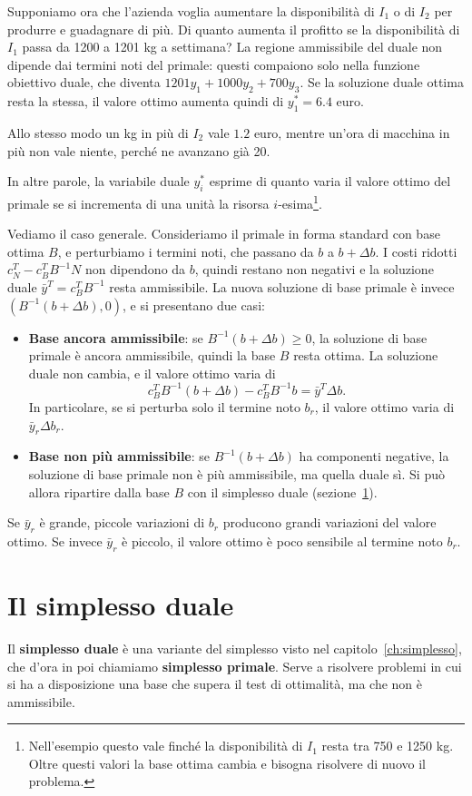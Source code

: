 Supponiamo ora che l'azienda voglia aumentare la disponibilità di $I_1$ o di $I_2$ per produrre e guadagnare di più. Di quanto aumenta il profitto se la disponibilità di $I_1$ passa da 1200 a 1201 kg a settimana? La regione ammissibile del duale non dipende dai termini noti del primale: questi compaiono solo nella funzione obiettivo duale, che diventa $1201y_1 + 1000y_2 + 700y_3$. Se la soluzione duale ottima resta la stessa, il valore ottimo aumenta quindi di $y_1^* = 6.4$ euro.

Allo stesso modo un kg in più di $I_2$ vale $1.2$ euro, mentre un'ora di macchina in più non vale niente, perché ne avanzano già 20.

In altre parole, la variabile duale $y_i^*$ esprime di quanto varia il valore ottimo del primale se si incrementa di una unità la risorsa $i$-esima\footnote{Nell'esempio questo vale finché la disponibilità di $I_1$ resta tra 750 e 1250 kg. Oltre questi valori la base ottima cambia e bisogna risolvere di nuovo il problema.}.

Vediamo il caso generale. Consideriamo il primale in forma standard con base ottima $B$, e perturbiamo i termini noti, che passano da $b$ a $b + \Delta b$. I costi ridotti $c_N^T - c_B^T B^{-1} N$ non dipendono da $b$, quindi restano non negativi e la soluzione duale $\bar{y}^T = c_B^T B^{-1}$ resta ammissibile. La nuova soluzione di base primale è invece $(B^{-1}(b + \Delta b), 0)$, e si presentano due casi:
\begin{itemize}
    \item \textbf{Base ancora ammissibile}: se $B^{-1}(b + \Delta b) \ge 0$, la soluzione di base primale è ancora ammissibile, quindi la base $B$ resta ottima. La soluzione duale non cambia, e il valore ottimo varia di
    \[
    c_B^T B^{-1}(b + \Delta b) - c_B^T B^{-1} b = \bar{y}^T \Delta b.
    \]
    In particolare, se si perturba solo il termine noto $b_r$, il valore ottimo varia di $\bar{y}_r \Delta b_r$.
    \item \textbf{Base non più ammissibile}: se $B^{-1}(b + \Delta b)$ ha componenti negative, la soluzione di base primale non è più ammissibile, ma quella duale sì. Si può allora ripartire dalla base $B$ con il simplesso duale (sezione~\ref{sec:simplesso-duale}).
\end{itemize}
Se $\bar{y}_r$ è grande, piccole variazioni di $b_r$ producono grandi variazioni del valore ottimo. Se invece $\bar{y}_r$ è piccolo, il valore ottimo è poco sensibile al termine noto $b_r$.

\section{Il simplesso duale}\label{sec:simplesso-duale}
Il \textbf{simplesso duale} è una variante del simplesso visto nel capitolo~\ref{ch:simplesso}, che d'ora in poi chiamiamo \textbf{simplesso primale}. Serve a risolvere problemi in cui si ha a disposizione una base che supera il test di ottimalità, ma che non è ammissibile.

